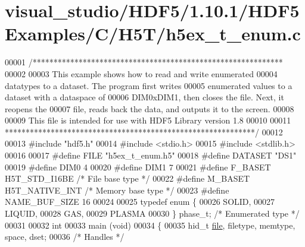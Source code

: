 \hypertarget{visual__studio_2_h_d_f5_21_810_81_2_h_d_f5_examples_2_c_2_h5_t_2h5ex__t__enum_8c_source}{}\section{visual\+\_\+studio/\+H\+D\+F5/1.10.1/\+H\+D\+F5\+Examples/\+C/\+H5\+T/h5ex\+\_\+t\+\_\+enum.c}
\label{visual__studio_2_h_d_f5_21_810_81_2_h_d_f5_examples_2_c_2_h5_t_2h5ex__t__enum_8c_source}

\begin{DoxyCode}
00001 \textcolor{comment}{/************************************************************}
00002 \textcolor{comment}{}
00003 \textcolor{comment}{  This example shows how to read and write enumerated}
00004 \textcolor{comment}{  datatypes to a dataset.  The program first writes}
00005 \textcolor{comment}{  enumerated values to a dataset with a dataspace of}
00006 \textcolor{comment}{  DIM0xDIM1, then closes the file.  Next, it reopens the}
00007 \textcolor{comment}{  file, reads back the data, and outputs it to the screen.}
00008 \textcolor{comment}{}
00009 \textcolor{comment}{  This file is intended for use with HDF5 Library version 1.8}
00010 \textcolor{comment}{}
00011 \textcolor{comment}{ ************************************************************/}
00012 
00013 \textcolor{preprocessor}{#include "hdf5.h"}
00014 \textcolor{preprocessor}{#include <stdio.h>}
00015 \textcolor{preprocessor}{#include <stdlib.h>}
00016 
00017 \textcolor{preprocessor}{#define FILE            "h5ex\_t\_enum.h5"}
00018 \textcolor{preprocessor}{#define DATASET         "DS1"}
00019 \textcolor{preprocessor}{#define DIM0            4}
00020 \textcolor{preprocessor}{#define DIM1            7}
00021 \textcolor{preprocessor}{#define F\_BASET         H5T\_STD\_I16BE       }\textcolor{comment}{/* File base type */}\textcolor{preprocessor}{}
00022 \textcolor{preprocessor}{#define M\_BASET         H5T\_NATIVE\_INT      }\textcolor{comment}{/* Memory base type */}\textcolor{preprocessor}{}
00023 \textcolor{preprocessor}{#define NAME\_BUF\_SIZE   16}
00024 
00025 \textcolor{keyword}{typedef} \textcolor{keyword}{enum} \{
00026     SOLID,
00027     LIQUID,
00028     GAS,
00029     PLASMA
00030 \} phase\_t;                                  \textcolor{comment}{/* Enumerated type */}
00031 
00032 \textcolor{keywordtype}{int}
00033 main (\textcolor{keywordtype}{void})
00034 \{
00035     hid\_t       \hyperlink{structfile}{file}, filetype, memtype, space, dset;
00036                                             \textcolor{comment}{/* Handles */}

\end{DoxyCode}
